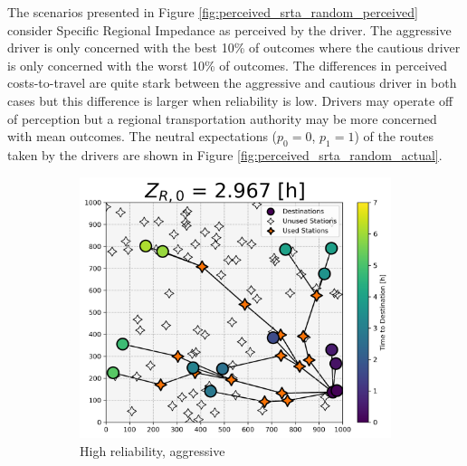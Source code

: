 The scenarios presented in Figure \ref{fig:perceived_srta_random_perceived} consider Specific Regional Impedance as perceived by the driver. The aggressive driver is only concerned with the best 10\% of outcomes where the cautious driver is only concerned with the worst 10\% of outcomes. The differences in perceived costs-to-travel are quite stark between the aggressive and cautious driver in both cases but this difference is larger when reliability is low. Drivers may operate off of perception but a regional transportation authority may be more concerned with mean outcomes. The neutral expectations ($p_0 = 0$, $p_1 = 1$) of the routes taken by the drivers are shown in Figure \ref{fig:perceived_srta_random_actual}.

\begin{figure}[H]
	\centering
	\begin{subfigure}[t]{.5\linewidth}
		\centering\captionsetup{width = .8\linewidth}
		\includegraphics[width = \linewidth]{figs/random_example_high_reliability_aggressive_actual.png}
		\caption{High reliability, aggressive}
	\end{subfigure}%
	\begin{subfigure}[t]{.5\linewidth}
		\centering\captionsetup{width = .8\linewidth}

\end{subfigure}
\end{figure}
